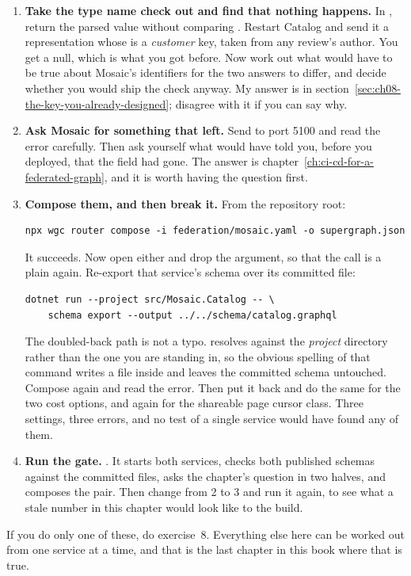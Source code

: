 \begin{enumerate}
  \item \textbf{Take the type name check out and find that nothing happens.} In
  , return the parsed value without comparing
  . Restart Catalog and send it a representation whose
   is a \emph{customer} key, taken from any review's author. You get a
  null, which is what you got before. Now work out what would have to be true
  about Mosaic's identifiers for the two answers to differ, and decide whether
  you would ship the check anyway. My answer is in
  section~\ref{sec:ch08-the-key-you-already-designed}; disagree with it if you
  can say why.

  \item \textbf{Ask Mosaic for something that left.} Send
   to port 5100 and read the error carefully. Then
  ask yourself what would have told you, before you deployed, that the field had
  gone. The answer is chapter~\ref{ch:ci-cd-for-a-federated-graph}, and it is
  worth having the question first.

  \item \textbf{Compose them, and then break it.} From the repository root:

  \begin{verbatim}
npx wgc router compose -i federation/mosaic.yaml -o supergraph.json
  \end{verbatim}

  It succeeds. Now open either  and drop the
   argument, so that the call is a plain
   again. Re-export that service's schema
  over its committed file:

  \begin{verbatim}
dotnet run --project src/Mosaic.Catalog -- \
    schema export --output ../../schema/catalog.graphql
  \end{verbatim}

  The doubled-back path is not a typo.  resolves
  \code{--output} against the \emph{project} directory rather than the one you
  are standing in, so the obvious spelling of that command writes a file inside
  \code{src/Mosaic.Catalog/} and leaves the committed schema untouched. Compose
  again and read the error. Then put it back and do the same for the two cost
  options, and again for the shareable page cursor class. Three settings, three
  errors, and no test of a single service would have found any of them.

  \item \textbf{Run the gate.} . It starts both
  services, checks both published schemas against the committed files, asks the
  chapter's question in two halves, and composes the pair. Then change
  \code{\$ExpectedSqlCommandCount} from 2 to 3 and run it again, to see what a
  stale number in this chapter would look like to the build.
\end{enumerate}

If you do only one of these, do exercise~8. Everything else here can be worked
out from one service at a time, and that is the last chapter in this book where
that is true.
